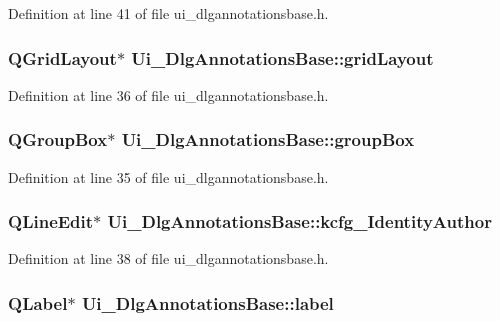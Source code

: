 Definition at line 41 of file ui\+\_\+dlgannotationsbase.\+h.

\hypertarget{classUi__DlgAnnotationsBase_afb984e4e864caf321acbb31c3ff41cf1}{
\subsubsection[{grid\+Layout}]{\setlength{\rightskip}{0pt plus 5cm}Q\+Grid\+Layout$\ast$ Ui\+\_\+\+Dlg\+Annotations\+Base\+::grid\+Layout}}\label{classUi__DlgAnnotationsBase_afb984e4e864caf321acbb31c3ff41cf1}


Definition at line 36 of file ui\+\_\+dlgannotationsbase.\+h.

\hypertarget{classUi__DlgAnnotationsBase_a620f381886ee725e9471cbeb91976de4}{
\subsubsection[{group\+Box}]{\setlength{\rightskip}{0pt plus 5cm}Q\+Group\+Box$\ast$ Ui\+\_\+\+Dlg\+Annotations\+Base\+::group\+Box}}\label{classUi__DlgAnnotationsBase_a620f381886ee725e9471cbeb91976de4}


Definition at line 35 of file ui\+\_\+dlgannotationsbase.\+h.

\hypertarget{classUi__DlgAnnotationsBase_a31e52a2794f81e8ca7aa944cadb58b57}{
\subsubsection[{kcfg\+\_\+\+Identity\+Author}]{\setlength{\rightskip}{0pt plus 5cm}Q\+Line\+Edit$\ast$ Ui\+\_\+\+Dlg\+Annotations\+Base\+::kcfg\+\_\+\+Identity\+Author}}\label{classUi__DlgAnnotationsBase_a31e52a2794f81e8ca7aa944cadb58b57}


Definition at line 38 of file ui\+\_\+dlgannotationsbase.\+h.

\hypertarget{classUi__DlgAnnotationsBase_ae41f677019efd58f0974f5e829324cd2}{
\subsubsection[{label}]{\setlength{\rightskip}{0pt plus 5cm}Q\+Label$\ast$ Ui\+\_\+\+Dlg\+Annotations\+Base\+::label}}\label{classUi__DlgAnnotationsBase_ae41f677019efd58f0974f5e829324cd2}


